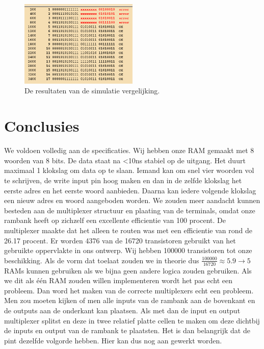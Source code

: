 \documentclass{scrartcl}  %
\begin{document}
\begin{figure}[H]
\centering
		\includegraphics[width=0.5\textwidth]{resource/compare}
		\caption{De resultaten van de simulatie vergelijking.}
		\label{fig:compare-ram}
\end{figure}

\section{Conclusies}
We voldoen volledig aan de specificaties.
Wij hebben onze RAM gemaakt met 8 woorden van 8 bits.
De data staat na <10ns stabiel op de uitgang.
Het duurt maximaal 1 klokslag om data op te slaan.
Iemand kan om snel vier woorden vol te schrijven, de write input pin hoog maken en dan in de zelfde klokslag het eerste adres en het eerste woord aanbieden.
Daarna kan iedere volgende klokslag een nieuw adres en woord aangeboden worden.
We zouden meer aandacht kunnen besteden aan de multiplexer structuur en plaating van de terminals, omdat onze rambank heeft op zichzelf een excellente efficientie van 100 procent.
De multiplexer maakte dat het alleen te routen was met een efficientie van rond de 26.17 procent.
Er worden 4376 van de 16720 transistoren gebruikt van het gebruikte oppervlakte in ons ontwerp.
Wij hebben 100000 transistoren tot onze beschikking. \cite[93]{epo3-manual}
Als de vorm dat toelaat zouden we in theorie dus $\frac{100000}{16720} \approx 5.9 \rightarrow 5$ RAMs kunnen gebruiken als we bijna geen andere logica zouden gebruiken.
Als we dit als één RAM zouden willen implementeren wordt het pas echt een probleem.
Dan word het maken van de correcte multiplexers echt een probleem.
Men zou moeten kijken of men alle inputs van de rambank aan de bovenkant en de outputs aan de onderkant kan plaatsen.
Als met dan de input en output multiplexer splitst en deze in twee relatief platte cellen te maken om deze dichtbij de inputs en output van de rambank te plaatsten.
Het is dan belangrijk dat de pint dezelfde volgorde hebben.
Hier kan dus nog aan gewerkt worden.
\end{document}
